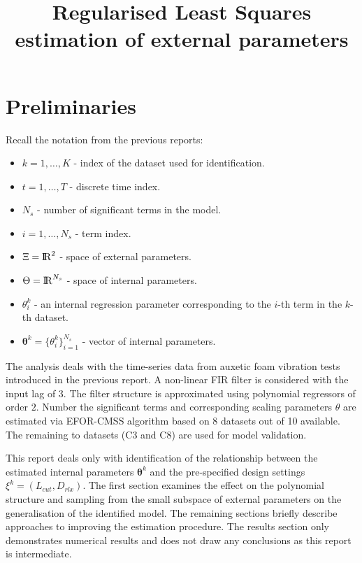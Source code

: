 \documentclass[a4paper,11pt,twoside]{article}
\title{Regularised Least Squares estimation of external parameters}
\def\dataset{C}
\def\order{2}
\DeclareMathOperator{\R}{\rm I\!R}
\theoremstyle{mytheoremstyle}
\begin{document}
	\maketitle
\section*{Preliminaries}
\par Recall the notation from the previous reports:
\begin{itemize}
	\item[] $k = 1, \dots, K$ - index of the dataset used for identification.
	\item[] $t = 1, \dots, T$ - discrete time index.
	\item[] $N_s$ - number of significant terms in the model.
	\item[] $i = 1, \dots, N_s$ - term index.
	\item[] $\Xi = \R^2$ - space of external parameters.
	\item[] $\Theta = \R^{N_s}$ - space of internal parameters.
	\item[]	$\theta^{k}_{i}$ - an internal regression parameter corresponding to the $i$-th term in the $k$-th dataset.
	\item[] $\mathbf{\theta}^k = \{\theta^{k}_{i}\}_{i=1}^{N_s}$ - vector of internal parameters.
\end{itemize}
\par The analysis deals with the time-series data from auxetic foam vibration tests introduced in the previous report. A non-linear FIR filter is considered with the input lag of 3. The filter structure is approximated using polynomial regressors of order $\order$. Number the significant terms and corresponding scaling parameters $\theta$ are estimated via EFOR-CMSS algorithm based on 8 datasets out of 10 available. The remaining to datasets (\dataset3 and \dataset8) are used for model validation. 
\par This report deals only with identification of the relationship between the estimated internal parameters $\mathbf{\theta}^k$ and the pre-specified design settings $\xi^k = (L_{cut}, D_{rlx})$. The first section examines the effect on the polynomial structure and sampling from the small subspace of external parameters on the generalisation of the identified model. The remaining sections briefly describe approaches to improving the estimation procedure. The results section only demonstrates numerical results and does not draw any conclusions as this report is intermediate.
\end{document}
